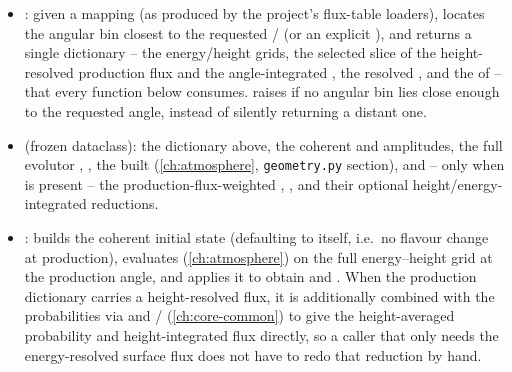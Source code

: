 \begin{implbox}
\begin{itemize}
  \item {}: given a
     mapping (as produced by
    the project's flux-table loaders), locates the angular bin closest to
    the requested / (or an explicit
    ), and returns a single  dictionary
    -- the energy/height grids, the selected slice of the height-resolved
    production flux  and the angle-integrated
    , the resolved , and the
     of  -- that
    every function below consumes.  raises if
    no angular bin lies close enough to the requested angle, instead of
    silently returning a distant one.
  \item {} (frozen dataclass): the
     dictionary above, the coherent 
    and  amplitudes, the full evolutor
    , , the built
     (\cref{ch:atmosphere}, \texttt{geometry.py}
    section), and -- only when  is present --
    the production-flux-weighted ,
    , and their optional height/energy-integrated
    reductions.
  \item {}:
    builds the coherent initial state (defaulting to
     itself, i.e.\ no flavour change at
    production), evaluates 
    (\cref{ch:atmosphere}) on the full energy--height grid at the
    production angle, and applies it to obtain  and
    . When the production dictionary carries a
    height-resolved flux, it is additionally combined with the
    probabilities via  and
    /
    (\cref{ch:core-common}) to give the height-averaged probability and
    height-integrated flux directly, so a caller that only needs the
    energy-resolved surface flux does not have to redo that reduction by
    hand.
\end{itemize}
\end{implbox}

